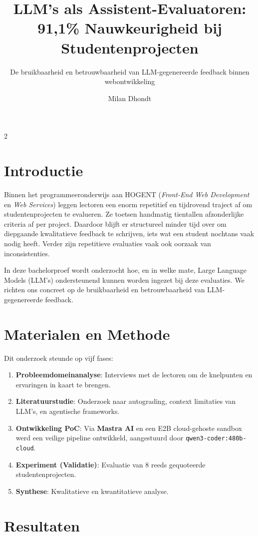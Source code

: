 \documentclass[a0,portrait]{hogent-poster}
\title{LLM's als Assistent-Evaluatoren: 91,1\% Nauwkeurigheid bij Studentenprojecten}
\subtitle{De bruikbaarheid en betrouwbaarheid van LLM-gegenereerde feedback binnen webontwikkeling}
\author{Milan Dhondt}
\begin{document}
\maketitle

\begin{multicols}{2}

\section{Introductie}

Binnen het programmeeronderwijs aan HOGENT (\textit{Front-End Web Development} en \textit{Web Services}) leggen lectoren een enorm repetitief en tijdrovend traject af om studentenprojecten te evalueren. Ze toetsen handmatig tientallen afzonderlijke criteria af per project. Daardoor blijft er structureel minder tijd over om diepgaande kwalitatieve feedback te schrijven, iets wat een student nochtans vaak nodig heeft. Verder zijn repetitieve evaluaties vaak ook oorzaak van inconsistenties.

In deze bachelorproef wordt onderzocht hoe, en in welke mate, Large Language Models (LLM's) ondersteunend kunnen worden ingezet bij deze evaluaties. We richten ons concreet op de bruikbaarheid en betrouwbaarheid van LLM-gegenereerde feedback.

\section{Materialen en Methode}

Dit onderzoek steunde op vijf fases:
\begin{enumerate}
    \item \textbf{Probleemdomeinanalyse}: Interviews met de lectoren om de knelpunten en ervaringen in kaart te brengen.
    \item \textbf{Literatuurstudie}: Onderzoek naar autograding, context limitaties van LLM's, en agentische frameworks.
    \item \textbf{Ontwikkeling PoC}: Via \textbf{Mastra AI} en een E2B cloud-gehoste sandbox werd een veilige pipeline ontwikkeld, aangestuurd door \texttt{qwen3-coder:480b-cloud}.
    \item \textbf{Experiment (Validatie)}: Evaluatie van 8 reeds gequoteerde studentenprojecten.
    \item \textbf{Synthese}: Kwalitatieve en kwantitatieve analyse.
\end{enumerate}

\section{Resultaten}


\end{multicols}
\end{document}
